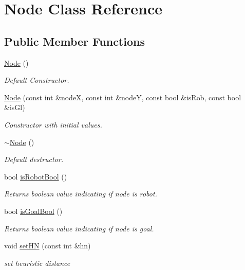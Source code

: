 \hypertarget{classNode}{}\section{Node Class Reference}
\label{classNode}
\subsection*{Public Member Functions}
\begin{DoxyCompactItemize}
\item 
\mbox{\hyperlink{classNode_ad7a34779cad45d997bfd6d3d8043c75f}{Node}} ()
\begin{DoxyCompactList}\small\item\em Default Constructor. \end{DoxyCompactList}\item 
\mbox{\hyperlink{classNode_abeab3810d389f577da145c5c79836b7d}{Node}} (const int \&nodeX, const int \&nodeY, const bool \&is\+Rob, const bool \&is\+Gl)
\begin{DoxyCompactList}\small\item\em Constructor with initial values. \end{DoxyCompactList}\item 
\mbox{\hyperlink{classNode_aa0840c3cb5c7159be6d992adecd2097c}{$\sim$\+Node}} ()
\begin{DoxyCompactList}\small\item\em Default destructor. \end{DoxyCompactList}\item 
bool \mbox{\hyperlink{classNode_ac74fc548dd704ffba0d2d2498d75c04d}{is\+Robot\+Bool}} ()
\begin{DoxyCompactList}\small\item\em Returns boolean value indicating if node is robot. \end{DoxyCompactList}\item 
bool \mbox{\hyperlink{classNode_afcaad545bd834248566eca68c9375fbc}{is\+Goal\+Bool}} ()
\begin{DoxyCompactList}\small\item\em Returns boolean value indicating if node is goal. \end{DoxyCompactList}\item 
void \mbox{\hyperlink{classNode_af9e1787d05908b711d23c37b970fcc5f}{set\+HN}} (const int \&hn)
\begin{DoxyCompactList}\small\item\em set heuristic distance \end{DoxyCompactList}\item 

\end{DoxyCompactItemize}
